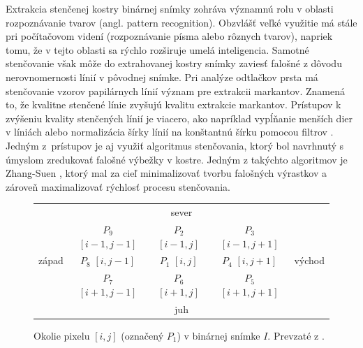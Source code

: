   Extrakcia stenčenej kostry binárnej snímky zohráva významnú rolu v oblasti rozpoznávanie tvarov (angl. pattern recognition). Obzvlášť veľké využitie má stále
  pri počítačovom videní (rozpoznávanie písma alebo rôznych tvarov), napriek tomu, že v tejto oblasti sa rýchlo rozširuje umelá inteligencia.
  Samotné stenčovanie však môže do extrahovanej kostry snímky zaviesť falošné  z dôvodu nerovnomernosti línií v pôvodnej snímke.
  Pri analýze odtlačkov prsta má stenčovanie vzorov papilárnych línií význam pre extrakcii markantov. Znamená to, že kvalitne stenčené línie zvyšujú kvalitu
  extrakcie markantov. Prístupov k zvýšeniu kvality stenčených línií je viacero, ako napríklad vypĺňanie menších dier v líniách alebo normalizácia šírky
  línií na konštantnú šírku pomocou filtrov \cite{Handbook}. Jedným z~prístupov je aj využiť algoritmus stenčovania, ktorý bol navrhnutý s úmyslom zredukovať
  falošné výbežky v kostre. Jedným z takýchto algoritmov je Zhang-Suen \cite{ZhangSuen_thinning}, ktorý mal za cieľ minimalizovať tvorbu falošných výrastkov
  a zároveň maximalizovať rýchlosť procesu stenčovania.
  
  \begin{figure}[h]
    \centering
      \begin{tabular}{ l | c | c | c | l }
        \multicolumn{5}{c}{sever} \\
        \cline{2-4}
        & \makecell{$P_9$ \\ $[i-1,j-1]$} & \makecell{$P_2$ \\ $[i-1,j]$} & \makecell{$P_3$ \\ $[i-1,j+1]$} \\ \cline{2-4}
        západ & \makecell{$P_8$ \\ $[i,j-1]$} & \makecell{$P_1$ \\ $[i,j]$} & \makecell{$P_4$ \\ $[i,j+1]$} & východ \\ \cline{2-4}
        & \makecell{$P_7$ \\ $[i+1,j-1]$} & \makecell{$P_6$ \\ $[i+1,j]$} & \makecell{$P_5$ \\ $[i+1,j+1]$} \\
        \cline{2-4}
        \multicolumn{5}{c}{juh}
      \end{tabular}
    \caption{Okolie pixelu $[i,j]$ (označený $P_1$) v binárnej snímke $I$. Prevzaté z \cite{ZhangSuen_thinning}.}
    \label{obr:okolie_ZhangSuen}
  \end{figure}

